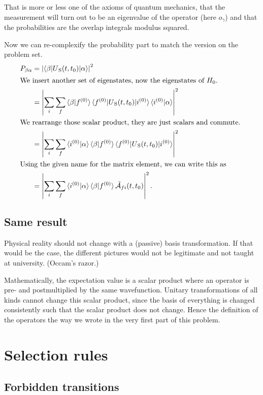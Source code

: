 \documentclass[11pt, english, fleqn, DIV=15, headinclude, BCOR=1.5cm]{scrartcl}
\begin{document}
That is more or less one of the axioms of quantum mechanics, that the
measurement will turn out to be an eigenvalue of the operator (here $o_\gamma$)
and that the probabilities are the overlap integrals modulus squared.

Now we can re-complexify the probability part to match the version on
the problem set.
\begin{align*}
    P_{\beta\alpha}
    &= \abs{\braket{\beta | U\SP(t, t_0)| \alpha}}^2 \\
    \intertext{%
        We insert another set of eigenstates, now the eigenstates of $H_0$.
    }
    &= \abs{\sum_i \sum_f \braket{\beta | f\0} \braket{f\0 | U\SP(t, t_0)| i\0}
    \braket{i\0 | \alpha}}^2 \\
    \intertext{%
        We rearrange those scalar product, they are just scalars and commute.
    }
    &= \abs{\sum_i \sum_f \braket{i\0 | \alpha} \braket{\beta | f\0}
    \braket{f\0 | U\SP(t, t_0)| i\0} }^2 \\
    \intertext{%
        Using the given name for the matrix element, we can write this as
    }
    &= \abs{\sum_i \sum_f \braket{i\0 | \alpha} \braket{\beta | f\0}
    \tilde{\mathcal A}_{fi}(t, t_0) }^2.
\end{align*}

\subsection{Same result}

Physical reality should not change with a (passive) basis transformation. If
that would be the case, the different pictures would not be legitimate and not
taught at university. (Occam's razor.)

Mathematically, the expectation value is a scalar product where an operator is
pre- and postmultiplied by the same wavefunction. Unitary transformations of
all kinds cannot change this scalar product, since the basis of everything is
changed consistently such that the scalar product does not change. Hence the
definition of the operators the way we wrote in the very first part of this
problem.

\section{Selection rules}

\subsection{Forbidden transitions}
\end{document}
